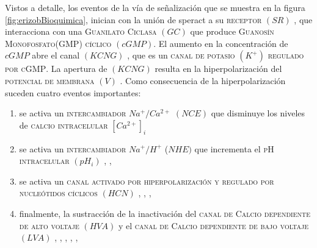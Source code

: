 Vistos a detalle, los eventos de la vía de señalización que se muestra en la figura \ref{fig:erizobBioquimica}, inician con la unión de speract a su \textsc{receptor} $(SR)$ \citeauthor{Darszon2008} \citep{Darszon2008}, que interacciona con una \textsc{Guanilato Ciclasa} $(GC)$ \citeauthor{Garbers:1976wy} \citep{Garbers:1976wy} que produce \textsc{Guanosín Monofosfato(GMP) cíclico} $(cGMP)$. El aumento en la concentración de $cGMP$ abre el canal $(KCNG)$ \citeauthor{Galindo:2007bx} \citep{Galindo:2007bx}, que es un \textsc{canal de potasio} $(K^+)$ \textsc{regulado por cGMP}. La apertura de $(KCNG)$ resulta en la hiperpolarización del \textsc{potencial de membrana} $(V)$ \citeauthor{Strunker:2006tk} \citep{Strunker:2006tk}. Como consecuencia de la hiperpolarización suceden cuatro eventos importantes:
\begin{enumerate}
\item se activa un \textsc{intercambiador} $Na^+/Ca^{2+}$ $(NCE)$ que disminuye los niveles de \textsc{calcio intracelular} $[Ca^{2+}]_i$ \citeauthor{Nishigaki:2004p4516} \citep{Nishigaki:2004p4516} 
\item se activa un \textsc{intercambiador} $Na^+/H^+$ ($NHE)$ que incrementa el \textsc{pH intracelular} $(pH_i)$ \citeauthor{Lee:1986vs} \citep{Lee:1986vs} \citeauthor{Wang:2003ke} \citep{Wang:2003ke}, \citeauthor{Su:2002fk} \citep{Su:2002fk}, \citeauthor{Rodriguez:2003do} \citep{Rodriguez:2003do}
\item se activa un \textsc{canal activado por hiperpolarización y regulado por nucleótidos cíclicos} $(HCN)$ \citeauthor{Nishigaki:2004p4516} \citep{Nishigaki:2004p4516}, \citeauthor{Rodriguez:2003do} \citep{Rodriguez:2003do}, \citeauthor{Gauss:1998de} \citep{Gauss:1998de}, \citeauthor{Galindo:2005wf} \citep{Galindo:2005wf}
\item finalmente, la sustracción de la inactivación del \textsc{canal de Calcio dependiente de alto voltaje} $(HVA)$ y el \textsc{canal de Calcio dependiente de bajo voltaje} $(LVA)$ \citeauthor{Strunker:2006tk} \citep{Strunker:2006tk}, \citeauthor{GranadosGonzalez:2005ia} \citep{GranadosGonzalez:2005ia}, \citeauthor{Wood:2003p4517} \citep{Wood:2003p4517}, \citeauthor{Wood:2005gg} \citep{Wood:2005gg}, \citeauthor{Darszon:2005tb} \cite{Darszon:2005tb}, \citeauthor{PerezReyes:2003bw} \citep{PerezReyes:2003bw}
\end{enumerate}

